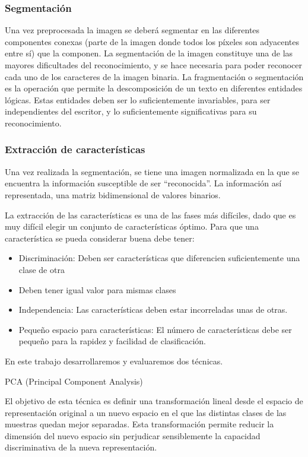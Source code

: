 \subsubsection{Segmentación}

Una vez preprocesada la imagen se deberá segmentar en las diferentes componentes conexas (parte de la imagen donde todos los píxeles son adyacentes entre sí) que la componen. La segmentación de la imagen constituye una de las mayores dificultades del reconocimiento, y se hace  necesaria para poder reconocer cada uno de los caracteres de la imagen binaria.
La fragmentación o segmentación es la operación que permite la descomposición  de  un  texto  en  diferentes  entidades lógicas. Estas entidades deben ser lo suficientemente invariables, para ser independientes del escritor, y lo suficientemente significativas para su reconocimiento.


\subsubsection{Extracción de características}

Una  vez  realizada  la  segmentación,  se  tiene  una  imagen normalizada en la que se encuentra la información susceptible de ser “reconocida”. La información así representada, una matriz bidimensional de valores binarios.

La extracción de las características es una de las fases  más difíciles, dado que es muy difícil elegir un conjunto de características óptimo.
Para que una característica se pueda considerar buena debe tener:
\begin{itemize}
    \item Discriminación: Deben  ser características que diferencien suficientemente una clase de otra
    \item Deben tener igual valor para mismas clases
    \item Independencia: Las características deben estar incorreladas unas de otras.
    \item Pequeño espacio para características: El número de características debe ser pequeño para la rapidez y facilidad de clasificación.
\end{itemize}

En este trabajo desarrollaremos y evaluaremos dos técnicas.


{\ttfamily PCA (Principal Component Analysis)}

El objetivo de esta técnica es definir una transformación lineal desde el espacio de representación original a un nuevo espacio en el que las distintas clases de las muestras quedan mejor separadas.
Esta transformación permite reducir la dimensión del nuevo espacio sin perjudicar sensiblemente la capacidad discriminativa de la nueva representación.

